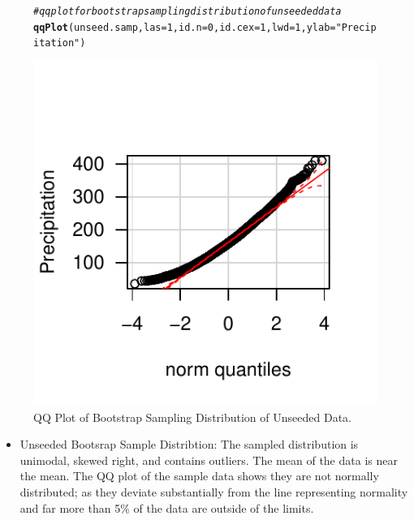\documentclass{article}\usepackage[]{graphicx}\usepackage[]{color}
\makeatletter
\def\maxwidth{ %
  \ifdim\Gin@nat@width>\linewidth
    \linewidth
  \else
    \Gin@nat@width
  \fi
}
\newcommand{\hlnum}[1]{\textcolor[rgb]{0.686,0.059,0.569}{#1}}%
\newcommand{\hlstr}[1]{\textcolor[rgb]{0.192,0.494,0.8}{#1}}%
\newcommand{\hlcom}[1]{\textcolor[rgb]{0.678,0.584,0.686}{\textit{#1}}}%
\newcommand{\hlstd}[1]{\textcolor[rgb]{0.345,0.345,0.345}{#1}}%
\newcommand{\hlkwc}[1]{\textcolor[rgb]{0.333,0.667,0.333}{#1}}%
\newcommand{\hlkwd}[1]{\textcolor[rgb]{0.737,0.353,0.396}{\textbf{#1}}}%
\newenvironment{kframe}{%
 \def\at@end@of@kframe{}%
 \ifinner\ifhmode%
  \def\at@end@of@kframe{\end{minipage}}%
  \begin{minipage}{\columnwidth}%
 \fi\fi%
 \def\FrameCommand##1{\hskip\@totalleftmargin \hskip-\fboxsep
 \colorbox{shadecolor}{##1}\hskip-\fboxsep
     \hskip-\linewidth \hskip-\@totalleftmargin \hskip\columnwidth}%
 \MakeFramed {\advance\hsize-\width
   \@totalleftmargin\z@ \linewidth\hsize
   \@setminipage}}%
 {\par\unskip\endMakeFramed%
 \at@end@of@kframe}
\newenvironment{knitrout}{}{} %
\makeatother
\begin{document}
\begin{figure}[H]  \begin{center}
\begin{knitrout}
\color{fgcolor}\begin{kframe}
\begin{alltt}
\hlcom{# qq plot for bootstrap sampling distribution of unseeded data}
\hlkwd{qqPlot}\hlstd{(unseed.samp,} \hlkwc{las} \hlstd{=} \hlnum{1}\hlstd{,} \hlkwc{id.n} \hlstd{=} \hlnum{0}\hlstd{,} \hlkwc{id.cex} \hlstd{=} \hlnum{1}\hlstd{,} \hlkwc{lwd} \hlstd{=} \hlnum{1}\hlstd{,} \hlkwc{ylab} \hlstd{=} \hlstr{"Precipitation"}\hlstd{)}
\end{alltt}
\end{kframe}
\includegraphics[width=\maxwidth]{figure/1a_qq_unseedsamp} 

\end{knitrout}
\end{center} \caption{QQ Plot of Bootstrap Sampling Distribution of Unseeded Data.} \end{figure}

\begin{itemize}
\item Unseeded Bootsrap Sample Distribtion:  The sampled distribution is unimodal, skewed right, and contains outliers.  The mean of the data is near the mean.  The QQ plot of the sample data shows they are not normally distributed; as they deviate substantially from the line representing normality and far more than 5\% of the data are outside of the limits.
\end{itemize}
\end{document}

